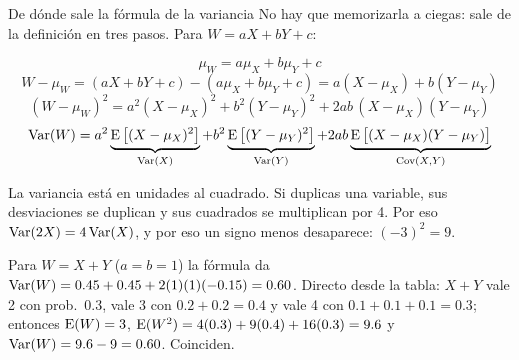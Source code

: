\begin{afondo}{De dónde sale la fórmula de la variancia}
No hay que memorizarla a ciegas: sale de la definición en tres pasos. Para $W=aX+bY+c$:

\begin{pasos}
\[\mu_W=a\mu_X+b\mu_Y+c\]
\[W-\mu_W=(aX+bY+c)-(a\mu_X+b\mu_Y+c)=a(X-\mu_X)+b(Y-\mu_Y)\]
\[(W-\mu_W)^2=a^2(X-\mu_X)^2+b^2(Y-\mu_Y)^2+2ab\,(X-\mu_X)(Y-\mu_Y)\]
\[\operatorname{Var}(W)=a^2\underbrace{\operatorname{E}\big[(X-\mu_X)^2\big]}_{\operatorname{Var}(X)}+b^2\underbrace{\operatorname{E}\big[(Y-\mu_Y)^2\big]}_{\operatorname{Var}(Y)}
+2ab\underbrace{\operatorname{E}\big[(X-\mu_X)(Y-\mu_Y)\big]}_{\operatorname{Cov}(X,Y)}\]
\end{pasos}

La variancia está en unidades al cuadrado. Si duplicas una variable, sus desviaciones se duplican y sus cuadrados se
multiplican por 4. Por eso $\operatorname{Var}(2X)=4\operatorname{Var}(X)$, y por eso un signo menos desaparece: $(-3)^2=9$.

Para $W=X+Y$ ($a=b=1$) la fórmula da $\operatorname{Var}(W)=0.45+0.45+2(1)(1)(-0.15)=0.60$.
Directo desde la tabla: $X+Y$ vale 2 con prob.~0.3, vale 3 con $0.2+0.2=0.4$ y vale 4 con $0.1+0.1+0.1=0.3$; entonces
$\operatorname{E}(W)=3$, $\operatorname{E}(W^2)=4(0.3)+9(0.4)+16(0.3)=9.6$ y $\operatorname{Var}(W)=9.6-9=0.60$. Coinciden.
\end{afondo}
